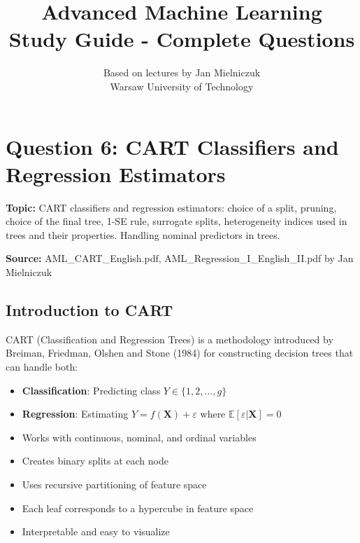 \documentclass[12pt,a4paper]{article}
\title{\textbf{Advanced Machine Learning} \\ 
       \Large Study Guide - Complete Questions}
\author{Based on lectures by Jan Mielniczuk \\ Warsaw University of Technology}
\date{}
\begin{document}
\maketitle

\tableofcontents
\newpage

\section{Question 6: CART Classifiers and Regression Estimators}

\textbf{Topic:} CART classifiers and regression estimators: choice of a split, pruning, choice of the final tree, 1-SE rule, surrogate splits, heterogeneity indices used in trees and their properties. Handling nominal predictors in trees.

\textbf{Source:} AML\_CART\_English.pdf, AML\_Regression\_I\_English\_II.pdf by Jan Mielniczuk

\subsection{Introduction to CART}

CART (Classification and Regression Trees) is a methodology introduced by Breiman, Friedman, Olshen and Stone (1984) for constructing decision trees that can handle both:

\begin{itemize}
    \item \textbf{Classification}: Predicting class $Y \in \{1, 2, \ldots, g\}$ 
    \item \textbf{Regression}: Estimating $Y = f(\mathbf{X}) + \varepsilon$ where $\mathbb{E}[\varepsilon|\mathbf{X}] = 0$
\end{itemize}

\begin{tcolorbox}[colback=blue!5!white,colframe=blue!75!black,title=Key Features of CART]
\begin{itemize}
    \item Works with continuous, nominal, and ordinal variables
    \item Creates binary splits at each node
    \item Uses recursive partitioning of feature space
    \item Each leaf corresponds to a hypercube in feature space
    \item Interpretable and easy to visualize
\end{itemize}
\end{tcolorbox}
\end{document}
